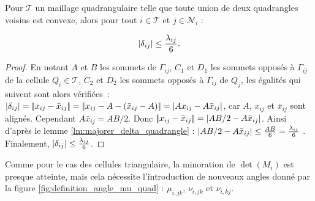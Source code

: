 \documentclass[12pt,a4paper]{article}
\begin{document}
	\begin{lm}\label{lm:maj_delta_quad}
		\begin{minipage}[t]{15cm}
			Pour $\mathcal T$ un maillage quadrangulaire telle que toute union de deux quadrangles voisins est convexe, alors pour tout $i \in \mathcal T$ et $j \in \mathcal N_i$ :
		\end{minipage}
		\begin{equation}
			\left\lvert \delta_{ij} \right\rvert \leq \frac{\lambda_{ij}}6.
		\end{equation}
	\end{lm}
	\begin{proof}
		En notant $A$ et $B$ les sommets de $\Gamma_{ij}$, $C_1$ et $D_1$ les sommets opposés à $\Gamma_{ij}$ de la cellule $Q_i \in \mathcal T$, $C_2$ et $D_2$ les sommets opposés à $\Gamma_{ij}$ de $Q_j$, les égalités qui suivent sont alors vérifiées : $\left\lvert \delta_{ij} \right\rvert = |\!|x_{ij} -\bar x_{ij}|\!| = |\!| x_{ij}-A - (\bar x_{ij}-A)|\!| = \left\lvert Ax_{ij}-A\bar x_{ij} \right\rvert$, car $A$, $x_{ij}$ et $\bar x_{ij}$ sont alignés. Cependant $A\bar x_{ij} = AB/2$. Donc $|\!|x_{ij} -\bar x_{ij}|\!| = \left\lvert AB/2-A\bar x_{ij} \right\rvert$. Ainsi d'après le lemme \ref{lm:majorer_delta_quadrangle} : $\left\lvert AB/2-A\bar x_{ij} \right\rvert\leq \frac{AB}6 = \frac{\lambda_{ij}}6 $ . Finalement, $\left\lvert \delta_{ij} \right\rvert \leq \frac{\lambda_{ij}}6$.
	\end{proof}
	
	Comme pour le cas des cellules triangulaire, la minoration de $\det(M_i)$ est presque atteinte, mais cela nécessite l'introduction de nouveaux angles donné par la figure \ref{fig:definition_angle_mu_quad} : $\mu_{i,jk}$, $\nu_{i,jk}$ et $\nu_{i,kj}$.
	
\end{document}
